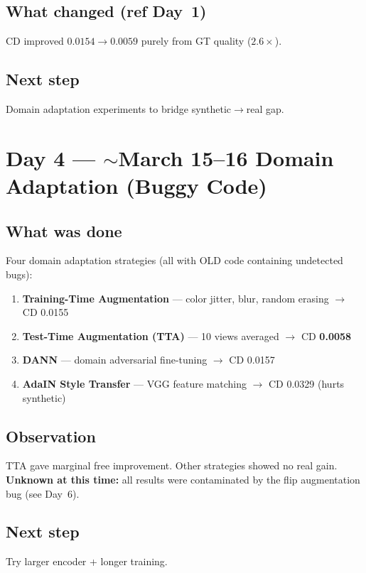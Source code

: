 \documentclass[10pt,a4paper]{article}
\begin{document}
\subsection*{What changed (ref Day~1)}
CD improved $0.0154 \to 0.0059$ purely from GT quality ($2.6\times$).

\subsection*{Next step}
Domain adaptation experiments to bridge synthetic$\to$real gap.

\section*{Day 4 --- $\sim$March 15--16 \hfill \normalfont\small Domain Adaptation (Buggy Code)}

\subsection*{What was done}
Four domain adaptation strategies (all with OLD code containing undetected bugs):
\begin{enumerate}[nosep]
    \item \textbf{Training-Time Augmentation} --- color jitter, blur, random erasing $\to$ CD 0.0155
    \item \textbf{Test-Time Augmentation (TTA)} --- 10 views averaged $\to$ CD \textbf{0.0058}
    \item \textbf{DANN} --- domain adversarial fine-tuning $\to$ CD 0.0157
    \item \textbf{AdaIN Style Transfer} --- VGG feature matching $\to$ CD 0.0329 (hurts synthetic)
\end{enumerate}

\subsection*{Observation}
TTA gave marginal free improvement. Other strategies showed no real gain. \textbf{Unknown at this time:} all results were contaminated by the flip augmentation bug (see Day~6).

\subsection*{Next step}
Try larger encoder + longer training.
\end{document}

